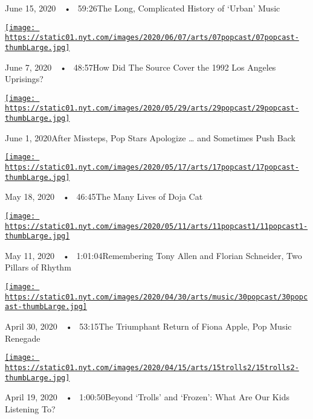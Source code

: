 June 15, 2020~~•~ 59:26The Long, Complicated History of `Urban' Music

\href{https://www.nytimes.com/2020/06/07/arts/music/popcast-the-source-rodney-king.html?action=click\&module=audio-series-bar\&region=header\&pgtype=Article}{\texttt{[image: https://static01.nyt.com/images/2020/06/07/arts/07popcast/07popcast-thumbLarge.jpg]}}

June 7, 2020~~•~ 48:57How Did The Source Cover the 1992 Los Angeles
Uprisings?

\href{https://www.nytimes.com/2020/06/01/arts/music/popcast-lana-del-rey-doja-cat-apologies.html?action=click\&module=audio-series-bar\&region=header\&pgtype=Article}{\texttt{[image: https://static01.nyt.com/images/2020/05/29/arts/29popcast/29popcast-thumbLarge.jpg]}}

June 1, 2020After Missteps, Pop Stars Apologize \ldots{} and Sometimes
Push Back

\href{https://www.nytimes.com/2020/05/18/arts/music/popcast-doja-cat.html?action=click\&module=audio-series-bar\&region=header\&pgtype=Article}{\texttt{[image: https://static01.nyt.com/images/2020/05/17/arts/17popcast/17popcast-thumbLarge.jpg]}}

May 18, 2020~~•~ 46:45The Many Lives of Doja Cat

\href{https://www.nytimes.com/2020/05/11/arts/music/popcast-tony-allen-florian-schneider.html?action=click\&module=audio-series-bar\&region=header\&pgtype=Article}{\texttt{[image: https://static01.nyt.com/images/2020/05/11/arts/11popcast1/11popcast1-thumbLarge.jpg]}}

May 11, 2020~~•~ 1:01:04Remembering Tony Allen and Florian Schneider,
Two Pillars of Rhythm

\href{https://www.nytimes.com/2020/04/30/arts/music/popcast-fiona-apple.html?action=click\&module=audio-series-bar\&region=header\&pgtype=Article}{\texttt{[image: https://static01.nyt.com/images/2020/04/30/arts/music/30popcast/30popcast-thumbLarge.jpg]}}

April 30, 2020~~•~ 53:15The Triumphant Return of Fiona Apple, Pop Music
Renegade

\href{https://www.nytimes.com/2020/04/19/arts/music/popcast-kids-music.html?action=click\&module=audio-series-bar\&region=header\&pgtype=Article}{\texttt{[image: https://static01.nyt.com/images/2020/04/15/arts/15trolls2/15trolls2-thumbLarge.jpg]}}

April 19, 2020~~•~ 1:00:50Beyond `Trolls' and `Frozen': What Are Our
Kids Listening To?


